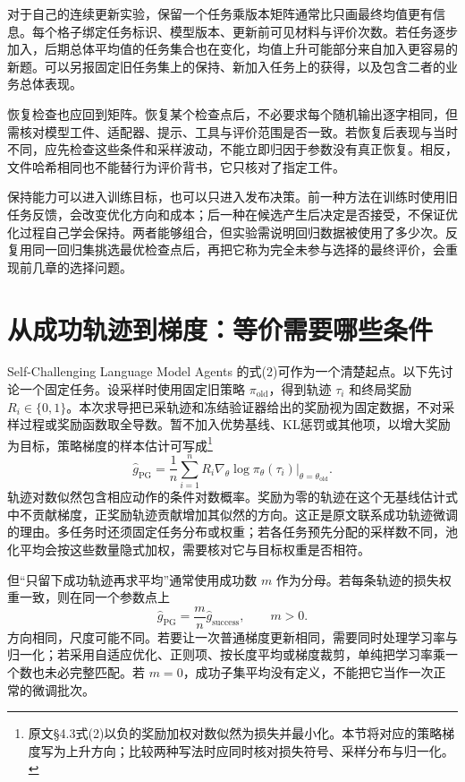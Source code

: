 对于自己的连续更新实验，保留一个任务乘版本矩阵通常比只画最终均值更有信息。每个格子绑定任务标识、模型版本、更新前可见材料与评价次数。若任务逐步加入，后期总体平均值的任务集合也在变化，均值上升可能部分来自加入更容易的新题。可以另报固定旧任务集上的保持、新加入任务上的获得，以及包含二者的业务总体表现。

恢复检查也应回到矩阵。恢复某个检查点后，不必要求每个随机输出逐字相同，但需核对模型工件、适配器、提示、工具与评价范围是否一致。若恢复后表现与当时不同，应先检查这些条件和采样波动，不能立即归因于参数没有真正恢复。相反，文件哈希相同也不能替行为评价背书，它只核对了指定工件。

保持能力可以进入训练目标，也可以只进入发布决策。前一种方法在训练时使用旧任务反馈，会改变优化方向和成本；后一种在候选产生后决定是否接受，不保证优化过程自己学会保持。两者能够组合，但实验需说明回归数据被使用了多少次。反复用同一回归集挑选最优检查点后，再把它称为完全未参与选择的最终评价，会重现前几章的选择问题。

\section{从成功轨迹到梯度：等价需要哪些条件}
\label{sec:ch10-gradient}

Self-Challenging Language Model Agents 的式(2)可作为一个清楚起点。以下先讨论一个固定任务。设采样时使用固定旧策略 $\pi_{\mathrm{old}}$，得到轨迹 $\tau_i$ 和终局奖励 $R_i\in\{0,1\}$。本次求导把已采轨迹和冻结验证器给出的奖励视为固定数据，不对采样过程或奖励函数取全导数。暂不加入优势基线、KL惩罚或其他项，以增大奖励为目标，策略梯度的样本估计可写成\footnote{原文\S4.3式(2)以负的奖励加权对数似然为损失并最小化。本节将对应的策略梯度写为上升方向；比较两种写法时应同时核对损失符号、采样分布与归一化。}
\begin{equation}
 \widehat g_{\mathrm{PG}}=
 \frac{1}{n}\sum_{i=1}^{n}R_i
 \nabla_\theta\log\pi_\theta(\tau_i)
 \big|_{\theta=\theta_{\mathrm{old}}}.
 \label{eq:ch10-pg}
\end{equation}
轨迹对数似然包含相应动作的条件对数概率。奖励为零的轨迹在这个无基线估计式中不贡献梯度，正奖励轨迹贡献增加其似然的方向。这正是原文联系成功轨迹微调的理由\cite{self-challenging-2506}。多任务时还须固定任务分布或权重；若各任务预先分配的采样数不同，池化平均会按这些数量隐式加权，需要核对它与目标权重是否相符。

但“只留下成功轨迹再求平均”通常使用成功数 $m$ 作为分母。若每条轨迹的损失权重一致，则在同一个参数点上
\begin{equation}
 \widehat g_{\mathrm{PG}}=
 \frac{m}{n}\widehat g_{\mathrm{success}},\qquad m>0.
 \label{eq:ch10-normalization}
\end{equation}
方向相同，尺度可能不同。若要让一次普通梯度更新相同，需要同时处理学习率与归一化；若采用自适应优化、正则项、按长度平均或梯度裁剪，单纯把学习率乘一个数也未必完整匹配。若 $m=0$，成功子集平均没有定义，不能把它当作一次正常的微调批次。

